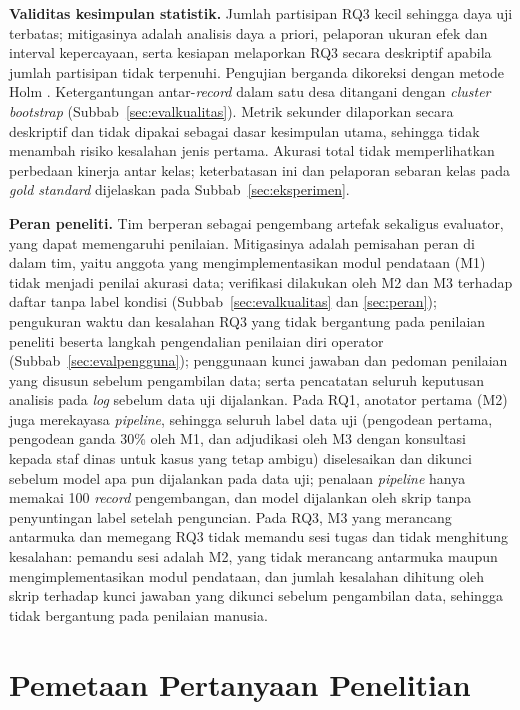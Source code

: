 \textbf{Validitas kesimpulan statistik.} Jumlah partisipan RQ3 kecil sehingga daya uji terbatas; mitigasinya adalah analisis daya a priori, pelaporan ukuran efek dan interval kepercayaan, serta kesiapan melaporkan RQ3 secara deskriptif apabila jumlah partisipan tidak terpenuhi. Pengujian berganda dikoreksi dengan metode Holm \cite{menyhart2021multipletesting}. Ketergantungan antar-\textit{record} dalam satu desa ditangani dengan \textit{cluster bootstrap} (Subbab~\ref{sec:evalkualitas}). Metrik sekunder dilaporkan secara deskriptif dan tidak dipakai sebagai dasar kesimpulan utama, sehingga tidak menambah risiko kesalahan jenis pertama. Akurasi total tidak memperlihatkan perbedaan kinerja antar kelas; keterbatasan ini dan pelaporan sebaran kelas pada \textit{gold standard} dijelaskan pada Subbab~\ref{sec:eksperimen}.

\textbf{Peran peneliti.} Tim berperan sebagai pengembang artefak sekaligus evaluator, yang dapat memengaruhi penilaian. Mitigasinya adalah pemisahan peran di dalam tim, yaitu anggota yang mengimplementasikan modul pendataan (M1) tidak menjadi penilai akurasi data; verifikasi dilakukan oleh M2 dan M3 terhadap daftar tanpa label kondisi (Subbab~\ref{sec:evalkualitas} dan \ref{sec:peran}); pengukuran waktu dan kesalahan RQ3 yang tidak bergantung pada penilaian peneliti beserta langkah pengendalian penilaian diri operator (Subbab~\ref{sec:evalpengguna}); penggunaan kunci jawaban dan pedoman penilaian yang disusun sebelum pengambilan data; serta pencatatan seluruh keputusan analisis pada \textit{log} sebelum data uji dijalankan. Pada RQ1, anotator pertama (M2) juga merekayasa \textit{pipeline}, sehingga seluruh label data uji (pengodean pertama, pengodean ganda 30\% oleh M1, dan adjudikasi oleh M3 dengan konsultasi kepada staf dinas untuk kasus yang tetap ambigu) diselesaikan dan dikunci sebelum model apa pun dijalankan pada data uji; penalaan \textit{pipeline} hanya memakai 100 \textit{record} pengembangan, dan model dijalankan oleh skrip tanpa penyuntingan label setelah penguncian. Pada RQ3, M3 yang merancang antarmuka dan memegang RQ3 tidak memandu sesi tugas dan tidak menghitung kesalahan: pemandu sesi adalah M2, yang tidak merancang antarmuka maupun mengimplementasikan modul pendataan, dan jumlah kesalahan dihitung oleh skrip terhadap kunci jawaban yang dikunci sebelum pengambilan data, sehingga tidak bergantung pada penilaian manusia.

\section{Pemetaan Pertanyaan Penelitian}
\label{sec:pemetaan}

